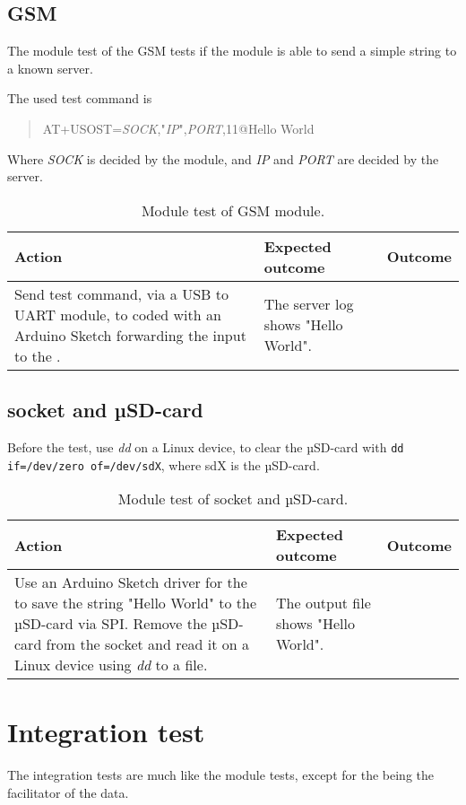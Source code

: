 \subsection{GSM \SARA}
The module test of the GSM \SARA tests if the module is able to send a simple string to a known server.

The used test command is
\begin{quote}
	AT+USOST=\textit{SOCK},"\textit{IP}",\textit{PORT},11@Hello World
\end{quote}
Where \textit{SOCK} is decided by the \SARA module, and \textit{IP} and \textit{PORT} are decided by the server.

\begin{table}[H]
	\centering
	\begin{tabularx}{\textwidth}{p{4.3cm} X X}
		\toprule
		\textbf{Action} & \textbf{Expected outcome} & \textbf{Outcome} \\
		\midrule
		Send test command, via a USB to UART module, to \MKR coded with an Arduino Sketch forwarding the input to the \SARA. & The server log shows "Hello World". & \\
		\bottomrule
	\end{tabularx}
	\caption{Module test of \SARA GSM module.}
	\label{AT:modGSM}
\end{table}

\subsection{\SDsock socket and µSD-card}
Before the test, use \textit{dd} on a Linux device, to clear the µSD-card with \texttt{dd if=/dev/zero of=/dev/sdX}, where sdX is the µSD-card.

\begin{table}[H]
	\centering
	\begin{tabularx}{\textwidth}{p{4.3cm} X X}
		\toprule
		\textbf{Action} & \textbf{Expected outcome} & \textbf{Outcome} \\
		\midrule
		Use an Arduino Sketch driver for the \MKR to save the string "Hello World" to the µSD-card via SPI.
		Remove the µSD-card from the \SDsock socket and read it on a Linux device using \textit{dd} to a file. & The output file shows "Hello World". & \\
		\bottomrule
	\end{tabularx}
	\caption{Module test of \SDsock socket and µSD-card.}
	\label{AT:modSD}
\end{table}

\section{Integration test}
The integration tests are much like the module tests, except for the \MKR being the facilitator of the data.

